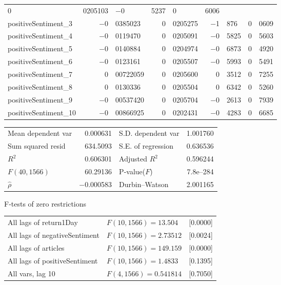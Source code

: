 \begin{center}
\begin{longtable}{lr@{.}lr@{.}lr@{.}lr@{.}l}
    0&0205103 &
        $-$0&5237 &
        0&6006 \\
positiveSentiment\_3 &
    $-$0&0385023 &
    0&0205275 &
        $-$1&876 &
        0&0609 \\
positiveSentiment\_4 &
    $-$0&0119470 &
    0&0205091 &
        $-$0&5825 &
        0&5603 \\
positiveSentiment\_5 &
    $-$0&0140884 &
    0&0204974 &
        $-$0&6873 &
        0&4920 \\
positiveSentiment\_6 &
    $-$0&0123161 &
    0&0205507 &
        $-$0&5993 &
        0&5491 \\
positiveSentiment\_7 &
    0&00722059 &
    0&0205600 &
        0&3512 &
        0&7255 \\
positiveSentiment\_8 &
    0&0130336 &
    0&0205504 &
        0&6342 &
        0&5260 \\
positiveSentiment\_9 &
    $-$0&00537420 &
    0&0205704 &
        $-$0&2613 &
        0&7939 \\
positiveSentiment\_10 &
    $-$0&00866925 &
    0&0202431 &
        $-$0&4283 &
        0&6685 \\
\end{longtable}

\begin{tabular}{lrlr}
Mean dependent var &  0.000631 & S.D. dependent var &  1.001760 \\
Sum squared resid &  634.5093 & S.E. of regression &  0.636536 \\
$R^2$ &  0.606301 & Adjusted $R^2$ &  0.596244 \\
$F(40, 1566)$ &  60.29136 & P-value($F$) &  7.8\textrm{e--284} \\
$\hat{\rho}$ & $-$0.000583 & Durbin--Watson &  2.001165 \\
\end{tabular}

\end{center}

\begin{center}
F-tests of zero restrictions\\[1em]
\begin{tabular}{lll}
All lags of return1Day & $F(10, 1566) = 13.504$ & [0.0000]\\
All lags of negativeSentiment & $F(10, 1566) = 2.73512$ & [0.0024]\\
All lags of articles & $F(10, 1566) = 149.159$ & [0.0000]\\
All lags of positiveSentiment & $F(10, 1566) = 1.4833$ & [0.1395]\\
All vars, lag 10 & $F(4, 1566) = 0.541814$ & [0.7050]\\
\end{tabular}
\end{center}

